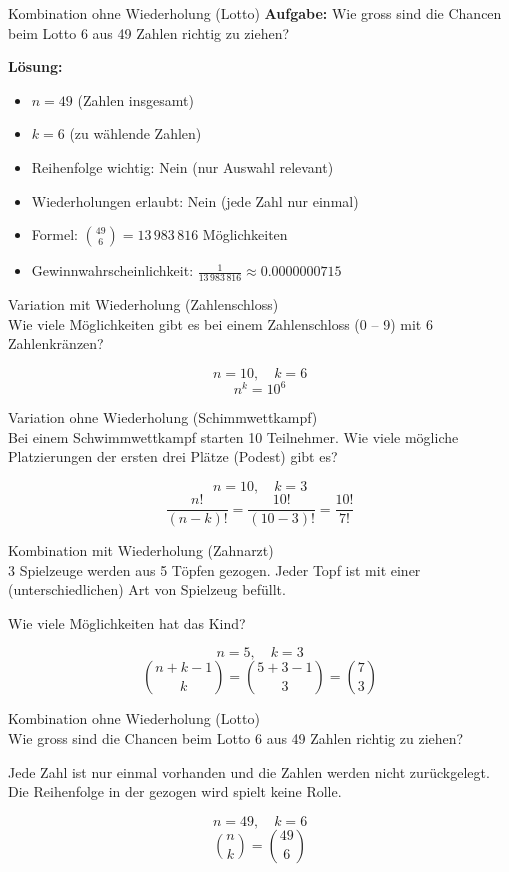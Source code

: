 \begin{example2}{Kombination ohne Wiederholung (Lotto)}
\textbf{Aufgabe:} Wie gross sind die Chancen beim Lotto 6 aus 49 Zahlen richtig zu ziehen?

\textbf{Lösung:}
\begin{itemize}
\item $n = 49$ (Zahlen insgesamt)
\item $k = 6$ (zu wählende Zahlen)
\item Reihenfolge wichtig: Nein (nur Auswahl relevant)
\item Wiederholungen erlaubt: Nein (jede Zahl nur einmal)
\item Formel: $\binom{49}{6} = 13\,983\,816$ Möglichkeiten
\item Gewinnwahrscheinlichkeit: $\frac{1}{13\,983\,816} \approx 0.0000000715$
\end{itemize}
\end{example2}

\begin{example2}{Variation mit Wiederholung (Zahlenschloss)}\\
Wie viele Möglichkeiten gibt es bei einem Zahlenschloss (0 -- 9) mit 6 Zahlenkränzen?

$$n = 10, \quad k = 6$$
$$n^k = 10^6$$
\end{example2}

\begin{example2}{Variation ohne Wiederholung (Schimmwettkampf)}\\
Bei einem Schwimmwettkampf starten 10 Teilnehmer. Wie viele mögliche Platzierungen der ersten drei Plätze (Podest) gibt es?

$$n = 10, \quad k = 3$$
$$\frac{n!}{(n-k)!} = \frac{10!}{(10-3)!} = \frac{10!}{7!}$$
\end{example2}

\begin{example2}{Kombination mit Wiederholung (Zahnarzt)}\\
3 Spielzeuge werden aus 5 Töpfen gezogen. Jeder Topf ist mit einer (unterschiedlichen) Art von Spielzeug befüllt.

Wie viele Möglichkeiten hat das Kind?

$$n = 5, \quad k = 3$$
$$\binom{n+k-1}{k} = \binom{5+3-1}{3} = \binom{7}{3}$$
\end{example2}

\begin{example2}{Kombination ohne Wiederholung (Lotto)}\\
Wie gross sind die Chancen beim Lotto 6 aus 49 Zahlen richtig zu ziehen?

Jede Zahl ist nur einmal vorhanden und die Zahlen werden nicht zurückgelegt. Die Reihenfolge in der gezogen wird spielt keine Rolle.

$$n = 49, \quad k = 6$$
$$\binom{n}{k} = \binom{49}{6}$$
\end{example2}



